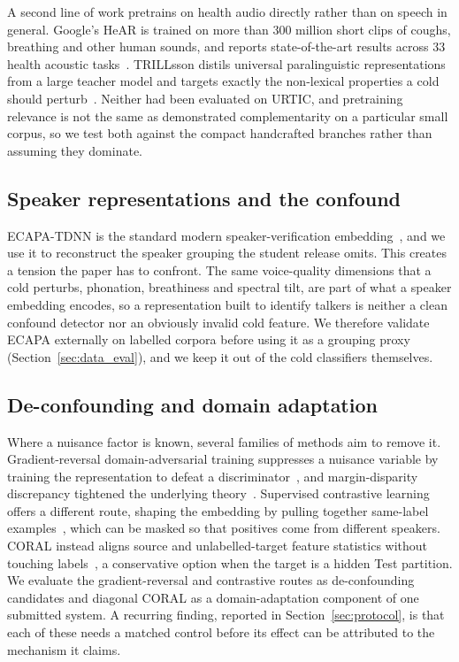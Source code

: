 A second line of work pretrains on health audio directly rather than on
speech in general. Google's HeAR is trained on more than 300 million short
clips of coughs, breathing and other human sounds, and reports
state-of-the-art results across 33 health acoustic
tasks~\cite{baur2024hear}. TRILLsson distils universal paralinguistic
representations from a large teacher model and targets exactly the
non-lexical properties a cold should perturb~\cite{shor2022trillsson}. Neither
had been evaluated on URTIC, and pretraining relevance is not the same as
demonstrated complementarity on a particular small corpus, so we test both
against the compact handcrafted branches rather than assuming they dominate.

\subsection{Speaker representations and the confound}

ECAPA-TDNN is the standard modern speaker-verification
embedding~\cite{desplanques2020ecapa}, and we use it to reconstruct the
speaker grouping the student release omits. This creates a tension the paper
has to confront. The same voice-quality dimensions that a cold perturbs,
phonation, breathiness and spectral tilt, are part of what a speaker embedding
encodes, so a representation built to identify talkers is neither a clean
confound detector nor an obviously invalid cold feature. We therefore validate
ECAPA externally on labelled corpora before using it as a grouping proxy
(Section~\ref{sec:data_eval}), and we keep it out of the cold classifiers
themselves.

\subsection{De-confounding and domain adaptation}

Where a nuisance factor is known, several families of methods aim to remove
it. Gradient-reversal domain-adversarial training suppresses a nuisance
variable by training the representation to defeat a
discriminator~\cite{ganin2015dann}, and margin-disparity discrepancy
tightened the underlying theory~\cite{zhang2019mdd}. Supervised contrastive
learning offers a different route, shaping the embedding by pulling together
same-label examples~\cite{khosla2020supcon}, which can be masked so that
positives come from different speakers. CORAL instead aligns source and
unlabelled-target feature statistics without touching
labels~\cite{sun2016coral}, a conservative option when the target is a hidden
Test partition. We evaluate the gradient-reversal and contrastive routes as
de-confounding candidates and diagonal CORAL as a domain-adaptation component
of one submitted system. A recurring finding, reported in
Section~\ref{sec:protocol}, is that each of these needs a matched control
before its effect can be attributed to the mechanism it claims.

